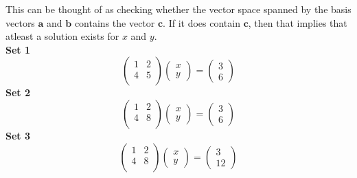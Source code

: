 \documentclass[12pt,letterpaper,fleqn]{article}
\theoremstyle{definition}
\begin{document}
This can be thought of as checking whether the vector space spanned by the basis vectors $\textbf{a}$ and $\textbf{b}$ contains the vector $\textbf{c}$. If it does contain $\textbf{c}$, then that implies that atleast a solution exists for $x$ and $y$.\\
\textbf{Set 1}\\
\begin{equation*}
\begin{pmatrix}
1 &2\\
4 &5\\
\end{pmatrix}
\begin{pmatrix}
x\\
y
\end{pmatrix} =
\begin{pmatrix}
3\\
6
\end{pmatrix}
\end{equation*}
\textbf{Set 2}\\
\begin{equation*}
\begin{pmatrix}
1 &2\\
4 &8\\
\end{pmatrix}
\begin{pmatrix}
x\\
y
\end{pmatrix} =
\begin{pmatrix}
3\\
6
\end{pmatrix}
\end{equation*}
\textbf{Set 3}\\
\begin{equation*}
\begin{pmatrix}
1 &2\\
4 &8\\
\end{pmatrix}
\begin{pmatrix}
x\\
y
\end{pmatrix} =
\begin{pmatrix}
3\\
12
\end{pmatrix}
\end{equation*}
\end{document}
